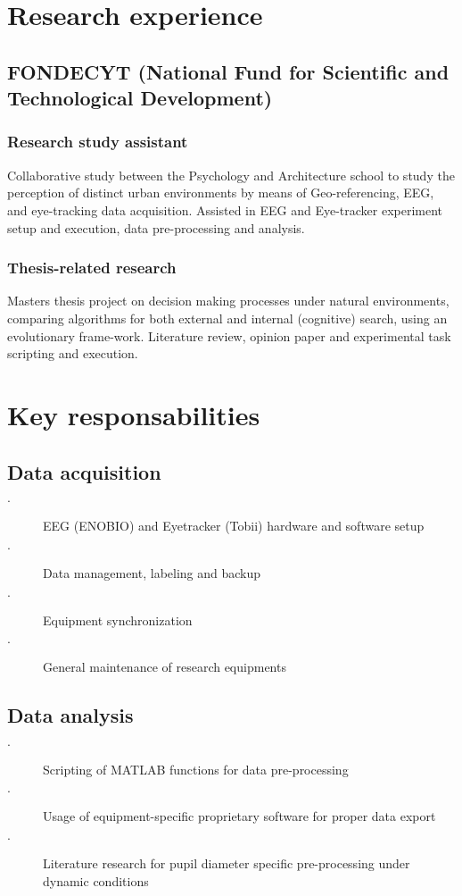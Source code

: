 \documentclass{article}
\begin{document}
\section{Research experience}
\subsection{FONDECYT {\small(National Fund for Scientific and Technological Development)}}
\subsubsection{Research study assistant}
Collaborative study between the Psychology and Architecture school to study the perception of distinct urban environments by means of Geo-referencing, EEG, and eye-tracking data acquisition. Assisted in EEG and Eye-tracker experiment setup and execution, data pre-processing and analysis.
\subsubsection{Thesis-related research}
Masters thesis project on decision making processes under natural environments, comparing algorithms for both external and internal (cognitive) search, using an evolutionary frame-work. Literature review, opinion paper and experimental task scripting and execution.

\section{Key responsabilities}
\subsection{Data acquisition}
\begin{description}
    \item[$\cdot$] EEG (ENOBIO) and Eyetracker (Tobii) hardware and software setup
    \item[$\cdot$] Data management, labeling and backup
    \item[$\cdot$] Equipment synchronization
    \item[$\cdot$] General maintenance of research equipments
\end{description}
\subsection{Data analysis}
\begin{description}
    \item[$\cdot$] Scripting of MATLAB functions for data pre-processing
    \item[$\cdot$] Usage of equipment-specific proprietary software for proper data export
    \item[$\cdot$] Literature research for pupil diameter specific pre-processing  under dynamic conditions 
\end{description}
\end{document}
